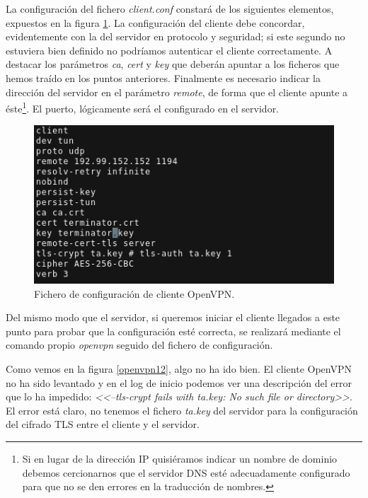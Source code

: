 \documentclass[a4paper, 11pt, titlepage]{article}
\begin{document}
        La configuración del fichero \textit{client.conf} constará de los siguientes elementos,
        expuestos en la figura \ref{openvpn11}. La configuración del cliente debe concordar,
        evidentemente con la del servidor en protocolo y seguridad; si este segundo no estuviera
        bien definido no podríamos autenticar el cliente correctamente. A destacar los parámetros
        \textit{ca}, \textit{cert} y \textit{key} que deberán apuntar a los ficheros que hemos
        traído en los puntos anteriores. Finalmente es necesario indicar la dirección del servidor
        en el parámetro \textit{remote}, de forma que el cliente apunte a éste\footnote{
            Si en lugar de la dirección IP quisiéramos indicar un nombre de dominio debemos
            cercionarnos que el servidor DNS esté adecuadamente configurado para que no se 
            den errores en la traducción de nombres.
        }. El puerto, lógicamente será el configurado en el servidor.

        \begin{figure}[htp]
            \centering
            \includegraphics[width=1\textwidth]{resources/openvpn11.png}
            \caption{Fichero de configuración de cliente OpenVPN.}
            \label{openvpn11}
        \end{figure}   

        Del mismo modo que el servidor, si queremos iniciar el cliente llegados a este punto 
        para probar que la configuración esté correcta, se realizará mediante el comando propio
        \textit{openvpn} seguido del fichero de configuración.

        Como vemos en la figura \ref{openvpn12}, algo no ha ido bien. El cliente OpenVPN no 
        ha sido levantado y en el log de inicio podemos ver una descripción del error que lo ha 
        impedido: \textit{<<--tls-crypt fails with ta.key: No such file or directory>>}. El 
        error está claro, no tenemos el fichero \textit{ta.key} del servidor para la configuración
        del cifrado TLS entre el cliente y el servidor.
\end{document}
